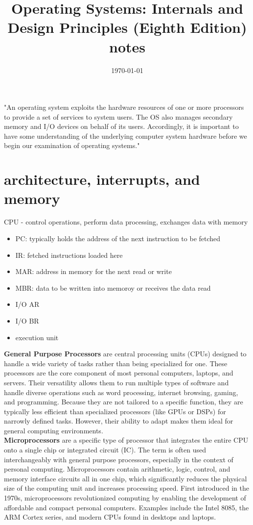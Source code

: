 \documentclass{article}
\title{Operating Systems: Internals and Design Principles (Eighth Edition) notes}
\date{\today}
\begin{document}
\maketitle

"An operating system exploits the hardware resources of one or more processors to provide a set of services to system users. The OS also manages secondary memory and I/O devices on behalf of its users. Accordingly, it is important to have some understanding of the underlying computer system hardware before we begin our examination of operating systems."

\section*{architecture, interrupts, and memory}
CPU - control operations, perform data processing, exchanges data with memory 
	\begin{itemize}
		\item PC: typically holds the address of the next instruction to be fetched
		\item IR: fetched instructions loaded here
		\item MAR: address in memory for the next read or write
		\item MBR: data to be written into memoroy or receives the data read
		\item I/O AR
		\item I/O BR
		\item execution unit
	\end{itemize}

\textbf{General Purpose Processors} are central processing units (CPUs) designed to handle a wide variety of tasks rather than being specialized for one. These processors are the core component of most personal computers, laptops, and servers. Their versatility allows them to run multiple types of software and handle diverse operations such as word processing, internet browsing, gaming, and programming. Because they are not tailored to a specific function, they are typically less efficient than specialized processors (like GPUs or DSPs) for narrowly defined tasks. However, their ability to adapt makes them ideal for general computing environments.\\

\textbf{Microprocessors} are a specific type of processor that integrates the entire CPU onto a single chip or integrated circuit (IC). The term is often used interchangeably with general purpose processors, especially in the context of personal computing. Microprocessors contain arithmetic, logic, control, and memory interface circuits all in one chip, which significantly reduces the physical size of the computing unit and increases processing speed. First introduced in the 1970s, microprocessors revolutionized computing by enabling the development of affordable and compact personal computers. Examples include the Intel 8085, the ARM Cortex series, and modern CPUs found in desktops and laptops.
\end{document}
